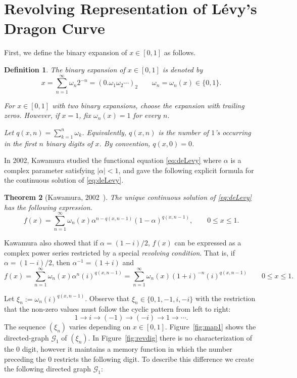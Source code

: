 \documentclass[epsf,10pt]{article}
\newcommand\GG{\mathcal{G}}
\newtheorem{theorem}{Theorem}[section]
\newtheorem{definition}[theorem]{Definition}
\begin{document}
\section{Revolving Representation of L\'evy's Dragon Curve}

First, we define the binary expansion of $x \in [0,1]$ as follows. 
\begin{definition}

The binary expansion of $x \in [0,1]$ is denoted by  
\begin{equation}
    x= \sum_{n=1}^{\infty}\omega_n2^{-n}=(0.\omega_1 \omega_2 \cdots )_{2} \qquad \omega_n = \omega_n(x) \in \{0,1\}.
\end{equation}

For $x\in [0,1]$ with two binary expansions, choose the expansion with trailing zeros. However, if $x=1$, fix $\omega_n(x) =1$ for every $n$.

Let $q(x,n) = \sum_{k=1}^n \omega_k$. Equivalently, $q(x,n)$ is the number of $1$'s occurring in the first $n$ binary digits of $x$. By convention, $q(x,0)=0$.

\end{definition}


In 2002, Kawamura studied the functional equation \eqref{eq:deLevy} where $\alpha$ is a complex parameter satisfying $|\alpha|<1$, and gave the following explicit formula for the continuous solution of \eqref{eq:deLevy}.

\begin{theorem}[Kawamura, 2002~\cite{Kawamura-2002}]
The unique continuous solution of \eqref{eq:deLevy} has the following expression.
\begin{equation}
    \label{kiko-levy}
    f(x) = \sum_{n=1}^{\infty} \omega_n(x)\alpha^{n-q(x,n-1)}(1-\alpha)^{q(x,n-1)}, \qquad 0 \leq x \leq 1.
\end{equation}
\end{theorem}

Kawamura also showed that if $\alpha=(1-i)/2$, $f(x)$ can be expressed as a complex power series restricted by a special \textit{revolving condition}. That is, if $\alpha=(1-i)/2$, then $\alpha^{-1}=(1+i)$ and 
\begin{equation}
\label{kiko-levy-2}
    f(x) = \sum_{n=1}^{\infty} \omega_n(x)\alpha^n(i)^{q(x,n-1)}=\sum_{n=1}^{\infty}\omega_n(x)(1+i)^{-n}(i)^{q(x,n-1)}
    \qquad 0 \leq x \leq 1.
\end{equation}

Let $\xi_n:=\omega_n(i)^{q(x,n-1)}$. Observe that $\xi_n \in \{0, 1,-1, i,-i\}$ with the restriction that the non-zero values must follow the cyclic pattern from left to right: 
$$1  \to i \to (-1) \to (-i) \to 1 \to \cdots.$$
The sequence $(\xi_n)$ varies depending on $x \in [0,1]$. Figure~\ref{fig:map1} shows the directed-graph $\GG_1$ of $(\xi_n)$. In Figure~\ref{fig:revdig} there is no characterization of the 0 digit, however it maintains a memory function in which the number preceding the 0 restricts the following digit. To describe this difference we create the following directed graph $\GG_1$:
\end{document}
